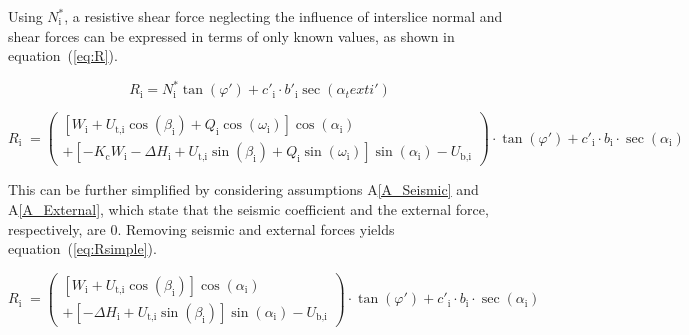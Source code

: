 \documentclass[12pt]{article}
\newcommand{\aref}[1]{A\ref{#1}}
\begin{document}
\noindent
Using $N^*_\text{i}$, a resistive shear force neglecting the influence
of interslice normal and shear forces can be expressed in terms of only known 
values, as shown in equation~(\ref{eq:R}).

\begin{equation*}
R_\text{i} = N^*_\text{i} \tan\left(\varphi'\right) + c'_\text{i}
\cdot b'_\text{i} \sec\left(\alpha_text{i}'\right)
\end{equation*}

\begin{equation}\label{eq:R}   R_{\text{i}} \; =
  \left( \begin{array}{l} \left[ W_{\text{i}} + U_{\text{t,i}}
      \cos\left(\beta_{\text{i}}\right) + Q_{\text{i}}
      \cos\left(\omega_{\text{i}}\right) \right]
    \cos\left(\alpha_{\text{i}}\right) \\ + \left[ - K_{\text{c}}
      W_{\text{i}} - \Delta H_{\text{i}} + U_{\text{t,i}}
      \sin\left(\beta_{\text{i}}\right) + Q_{\text{i}}
      \sin\left(\omega_{\text{i}}\right) \right]
    \sin\left(\alpha_{\text{i}}\right) - U_{\text{b,i}} \end{array}
  \right) \cdot \tan\left(\varphi'\right) + c'_{\text{i}} \cdot
  b_{\text{i}} \cdot \sec\left(\alpha_{\text{i}}\right)
 \end{equation}
 
\noindent This can be further simplified by considering assumptions 
\aref{A_Seismic} and 
\aref{A_External}, which state that the seismic coefficient and the external 
force, respectively, are 0. Removing seismic and external forces yields 
equation~(\ref{eq:Rsimple}).

\begin{equation}\label{eq:Rsimple}   R_{\text{i}} \; =
\left( \begin{array}{l} \left[ W_{\text{i}} + U_{\text{t,i}}
\cos\left(\beta_{\text{i}}\right) \right]
\cos\left(\alpha_{\text{i}}\right) \\ + \left[ - \Delta H_{\text{i}} + 
U_{\text{t,i}}
\sin\left(\beta_{\text{i}}\right) \right]
\sin\left(\alpha_{\text{i}}\right) - U_{\text{b,i}} \end{array}
\right) \cdot \tan\left(\varphi'\right) + c'_{\text{i}} \cdot
b_{\text{i}} \cdot \sec\left(\alpha_{\text{i}}\right)
\end{equation}

~\newline

\end{document}
